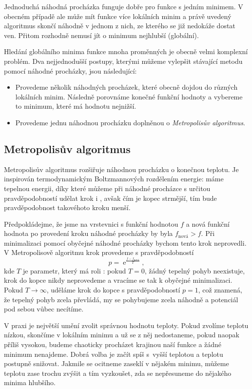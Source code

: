 \documentclass[a4paper,11pt,twoside]{article}
\DeclareMathOperator{\e}{e}
\theoremstyle{red}
\theoremstyle{green}
\begin{document}
    Jednoduchá náhodná procházka funguje dobře pro funkce s jedním minimem.
    V obecném případě ale může mít funkce více lokálních minim a právě uvedený algoritmus skončí náhodně v jednom z nich, ze kterého se již nedokáže dostat ven.
    Přitom rozhodně nemusí jít o minimum nejhlubší (globální).
    
    Hledání globálního minima funkce mnoha proměnných je obecně velmi komplexní problém.
    Dva nejjednodušší postupy, kterými můžeme vylepšit stávající metodu pomocí náhodné procházky, jsou následující:
    \begin{itemize}
        \item Provedeme několik náhodných procházek, které obecně dojdou do různých lokálních minim.
            Následně porovnáme konečné funkční hodnoty a vybereme to minimum, které má hodnotu nejnižší.
        \item Provedeme jednu náhodnou procházku doplněnou o \emph{Metropolisův algoritmus}. 
    \end{itemize}

\subsection{Metropolisův algoritmus}
    Metropolisův algoritmus rozšiřuje náhodnou procházku o konečnou teplotu.
    Je inspirován termodynamickým Boltzmannových rozdělením energie: 
    máme tepelnou energii, díky které můžeme při náhodné procházce s určitou pravděpodobností udělat krok i , avšak čím je kopec strmější, tím bude pravděpodobnost takovéhoto kroku menší.
    
    Předpokládejme, že jsme na vrstevnici s funkční hodnotou $f$ a nová funkční hodnota po provedení kroku náhodné procházky by byla $f_{\text{nová}}>f$.
    Při minimalizaci pomocí obyčejné náhodné procházky bychom tento krok neprovedli.
    V Metropolisově algoritmu krok provedeme s pravděpodobností
    \begin{equation}
        p=\e^{\frac{f-f_{\text{nová}}}{T}},
    \end{equation}
    kde $T$ je parametr, který má roli : pokud $T=0$, žádný tepelný pohyb neexistuje, krok do kopce nikdy neprovedeme a vracíme se tak k obyčejné minimalizaci.
    Pokud $T\rightarrow\infty$, uděláme krok do kopce s pravděpodobností $p=1$,
    což znamená, že tepelný pohyb zcela převládá, my se pohybujeme zcela náhodně a potenciál pod sebou vůbec necítíme.
    
    V praxi je největší umění zvolit správnou hodnotu teploty.
    Pokud zvolíme teplotu nízkou, skončíme v lokálním minimu a už se z něj nedostaneme, pokud naopak příliš vysokou, budeme chaoticky procházet krajinou naší funkce a žádné minimum nenajdeme.
    Dobrá volba je začít spíš s~vyšší teplotou a teplotu postupně snižovat.
    Jakmile se ocitneme zaseklí v nějakém minimu, můžeme teplotu zase trochu zvýšit a tím vyzkoušet, zda se nepřesuneme do nějakého minima hlubšího.
\end{document}
